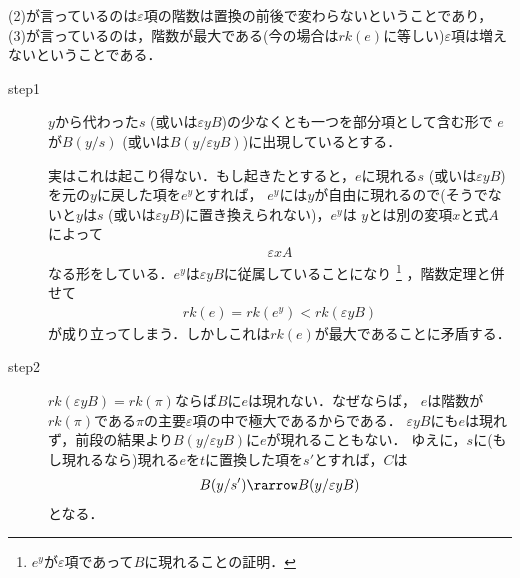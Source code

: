 	(2)が言っているのは$\varepsilon$項の階数は置換の前後で変わらないということであり，
	(3)が言っているのは，階数が最大である(今の場合は$rk(e)$に等しい)$\varepsilon$項は増えないということである．
	
	\begin{metaprf}\mbox{}
		\begin{description}
			\item[step1]
				$y$から代わった$s$ (或いは$\varepsilon y B$)の少なくとも一つを部分項として含む形で
				$e$が$B(y/s)$ (或いは$B(y/\varepsilon y B)$)に出現しているとする．
				
				実はこれは起こり得ない．もし起きたとすると，$e$に現れる$s$
				(或いは$\varepsilon y B$)
				を元の$y$に戻した項を$e^{y}$とすれば，
				$e^{y}$には$y$が自由に現れるので(そうでないと$y$は$s$
				(或いは$\varepsilon y B$)に置き換えられない)，$e^{y}$は
				$y$とは別の変項$x$と式$A$によって
				\begin{align}
					\varepsilon x A
				\end{align}
				なる形をしている．$e^{y}$は$\varepsilon y B$に従属していることになり
				\footnote{
					$e^{y}$が$\varepsilon$項であって$B$に現れることの証明．
				}
				，階数定理と併せて
				\begin{align}
					rk(e) = rk(e^{y}) < rk(\varepsilon y B)
				\end{align}
				が成り立ってしまう．しかしこれは$rk(e)$が最大であることに矛盾する．
				
			\item[step2] $rk(\varepsilon y B) = rk(\pi)$ならば$B$に$e$は現れない．なぜならば，
				$e$は階数が$rk(\pi)$である$\pi$の主要$\varepsilon$項の中で極大であるからである．
				$\varepsilon y B$にも$e$は現れず，前段の結果より$B(y/\varepsilon y B)$に$e$が現れることもない．
				ゆえに，$s$に(もし現れるなら)現れる$e$を$t$に置換した項を$s'$とすれば，$C$は
				\begin{align}
					B(y/s') \rarrow B(y/\varepsilon y B)
				\end{align}
				となる．
			

\end{description}
\end{metaprf}
